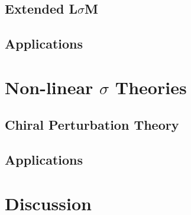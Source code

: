 \documentclass[aps,prd,onecolumn,showpacs,amsmath,amssymb,nofootinbib]{revtex4} \pdfoutput=1
\begin{document}
\subsection{Extended L$\sigma$M}
\subsection{Applications}
\section{Non-linear $\sigma$ Theories}\label{V}
\subsection{Chiral Perturbation Theory}
\subsection{Applications}

\section{Discussion}\label{VI}

\clearpage
%

\end{document}
